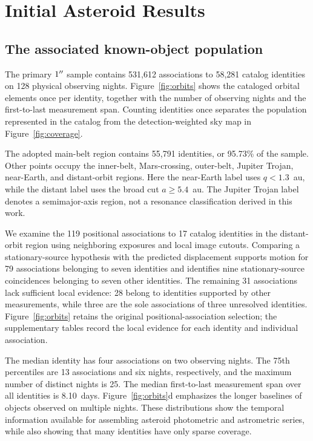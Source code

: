 \section{Initial Asteroid Results}
\label{sec:samples}

\subsection{The associated known-object population}
\label{sec:known_population}

The primary $1^{\prime\prime}$ sample contains 531,612 associations to
58,281 catalog identities on 128 physical observing nights.
Figure~\ref{fig:orbits} shows the cataloged orbital elements once
per identity, together with the number of observing nights and
the first-to-last measurement span. Counting identities once
separates the population represented in the catalog from the
detection-weighted sky map in Figure~\ref{fig:coverage}.

The adopted main-belt region contains 55,791 identities,
or 95.73\% of the sample. Other points occupy the inner-belt,
Mars-crossing, outer-belt, Jupiter Trojan, near-Earth, and
distant-orbit regions. Here the near-Earth label uses
$q<1.3$~au, while the distant label uses the broad cut
$a\geq5.4$~au. The Jupiter Trojan label denotes a
semimajor-axis region, not a resonance classification
derived in this work.

We examine the 119 positional associations to 17 catalog identities
in the distant-orbit region using neighboring exposures and local
image cutouts. Comparing a stationary-source hypothesis with the
predicted displacement supports motion for 79 associations belonging
to seven identities and identifies nine stationary-source
coincidences belonging to seven other identities. The remaining
31 associations lack sufficient local evidence: 28 belong to
identities supported by other measurements, while three are the
sole associations of three unresolved identities.
Figure~\ref{fig:orbits} retains the original positional-association
selection; the supplementary tables record the local evidence for
each identity and individual association.

The median identity has four associations on two
observing nights. The 75th percentiles are 13 associations
and six nights, respectively, and the maximum number
of distinct nights is 25. The median first-to-last
measurement span over all identities is 8.10~days.
Figure~\ref{fig:orbits}d emphasizes the longer baselines
of objects observed on multiple nights. These distributions
show the temporal information available for assembling
asteroid photometric and astrometric series, while also
showing that many identities have only sparse coverage.

